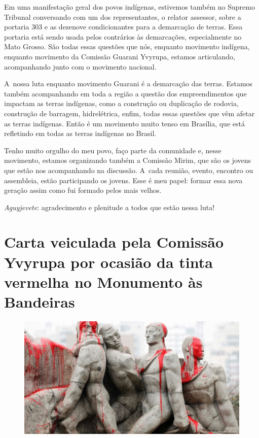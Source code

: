 Em uma manifestação geral dos povos indígenas, estivemos também no
Supremo Tribunal conversando com um dos representantes, o relator
assessor, sobre a portaria 303 e as dezenove condicionantes para a
demarcação de terras. Essa portaria está sendo usada pelos contrários
às demarcações, especialmente no Mato Grosso. São todas essas questões
que nós, enquanto movimento indígena, enquanto movimento da Comissão
Guarani Yvyrupa, estamos articulando, acompanhando junto com o
movimento nacional.

A~nossa luta enquanto movimento Guarani é a demarcação das terras.
Estamos também acompanhando em toda a região a questão dos
empreendimentos que impactam as terras indígenas, como a construção ou
duplicação de rodovia, construção de barragem, hidrelétrica, enfim,
todas essas questões que vêm afetar as terras indígenas. Então é um
movimento muito tenso em Brasília, que está refletindo em todas as
terras indígenas no Brasil.

Tenho muito orgulho do meu povo, faço parte da comunidade e, nesse
movimento, estamos organizando também a Comissão Mirim, que são os
jovens que estão nos acompanhando na discussão. A~cada reunião, evento,
encontro ou assembleia, estão participando os jovens. Esse é meu papel:
formar essa nova geração assim como fui formado pelos mais velhos. 

\emph{Aguyjevete}: agradecimento e plenitude a todos que estão nessa luta!

\chapter{Carta veiculada pela Comissão Yvyrupa por ocasião da tinta
vermelha no Monumento às Bandeiras}
\begin{figure}[h]
 \includegraphics[width=\textwidth]{./img/GUARANIS-img2.jpg}	
\end{figure}


